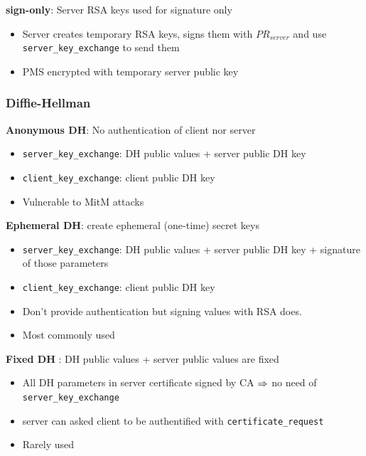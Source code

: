 \documentclass[english, leagacyboxes, nologo]{latex4ei/latex4ei_sheet}
\begin{document}
{    \textbf{sign-only}: Server RSA keys used for signature only
    \begin{itemize}
      \item Server creates temporary RSA keys, signs them with $PR_{server}$ and use \texttt{server\_key\_exchange} to send them
      \item PMS encrypted with temporary server public key
    \end{itemize}

  \subsubsection{Diffie-Hellman}
    \textbf{Anonymous DH}: No authentication of client nor server
    \begin{itemize}
      \item \texttt{server\_key\_exchange}: DH public values + server public DH key
      \item \texttt{client\_key\_exchange}: client public DH key
      \item Vulnerable to MitM attacks
    \end{itemize}

    \textbf{Ephemeral DH}: create ephemeral (one-time) secret keys
    \begin{itemize}
      \item \texttt{server\_key\_exchange}: DH public values + server public DH key + signature of those parameters
      \item \texttt{client\_key\_exchange}: client public DH key
      \item Don't provide authentication but signing values with RSA does.
      \item Most commonly used
    \end{itemize}

    \textbf{Fixed DH} : DH public values + server public values are fixed
    \begin{itemize}
      \item All DH parameters in server certificate signed by CA $\Rightarrow$ no need of \texttt{server\_key\_exchange}
      \item server can asked client to be authentified with \texttt{certificate\_request}
      \item Rarely used
    \end{itemize}

  }
\end{document}
